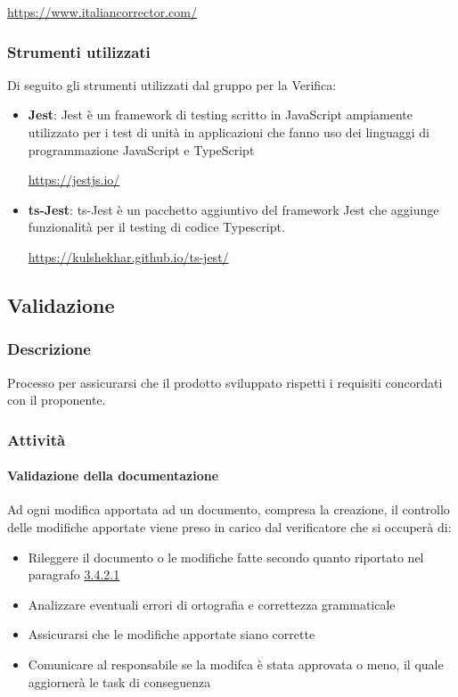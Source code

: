 \documentclass[12pt]{article}
\begin{document}
     \url{https://www.italiancorrector.com/}

\subsubsection{Strumenti utilizzati}
Di seguito gli strumenti utilizzati dal gruppo per la Verifica:
\begin{itemize}
    \item \textbf{Jest}: Jest è un framework di testing scritto in JavaScript ampiamente utilizzato per i test di unità in applicazioni che fanno uso dei linguaggi di programmazione JavaScript e TypeScript
          \begin{center}
              \url{https://jestjs.io/}
          \end{center}
    \item \textbf{ts-Jest}: ts-Jest è un pacchetto aggiuntivo del framework Jest che aggiunge funzionalità per il testing di codice Typescript.
          \begin{center}
              \url{https://kulshekhar.github.io/ts-jest/}
          \end{center}
\end{itemize}

\label{Validazione}
\subsection{Validazione}
\subsubsection{Descrizione}
Processo per assicurarsi che il prodotto sviluppato rispetti i requisiti concordati con il proponente.

\subsubsection{Attività}
\paragraph{Validazione della documentazione}
Ad ogni modifica apportata ad un documento, compresa la creazione, il controllo delle modifiche apportate viene preso in carico dal verificatore che si occuperà di:
\begin{itemize}
    \item Rileggere il documento o le modifiche fatte secondo quanto riportato nel paragrafo \hyperref[VerificaDocumento]{3.4.2.1}
    \item Analizzare eventuali errori di ortografia e correttezza grammaticale
    \item Assicurarsi che le modifiche apportate siano corrette
    \item Comunicare al responsabile se la modifca è stata approvata o meno, il quale aggiornerà le task di conseguenza
\end{itemize} 
\end{document}
